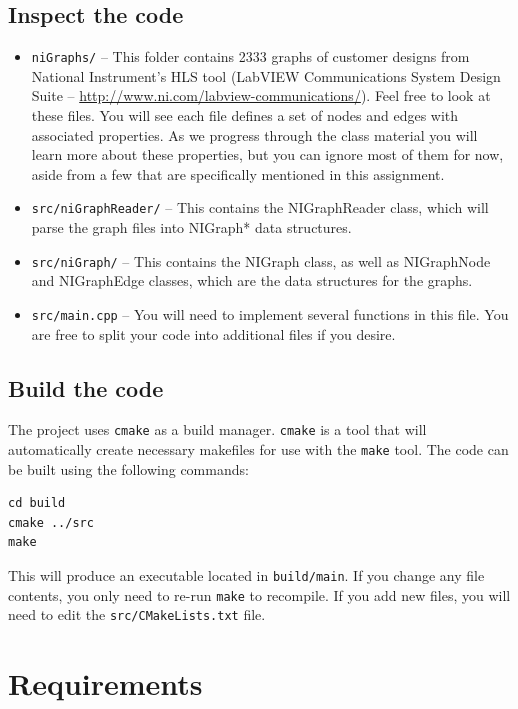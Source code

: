 \subsection{Inspect the code}
\begin{itemize}
	\item {\tt niGraphs/} -- This folder contains 2333 graphs of customer designs from National Instrument's HLS tool (LabVIEW Communications System Design Suite -- \url{http://www.ni.com/labview-communications/}).  Feel free to look at these files.  You will see each file defines a set of nodes and edges with associated properties.  As we progress through the class material you will learn more about these properties, but you can ignore most of them for now, aside from a few that are specifically mentioned in this assignment.
	\item {\tt src/niGraphReader/} -- This contains the NIGraphReader class, which will parse the graph files into NIGraph* data structures.
	\item {\tt src/niGraph/} -- This contains the NIGraph class, as well as NIGraphNode and NIGraphEdge classes, which are the data structures for the graphs.
	\item {\tt src/main.cpp} -- You will need to implement several functions in this file.  You are free to split your code into additional files if you desire.
\end{itemize}

\subsection{Build the code}
The project uses {\tt cmake} as a build manager.  {\tt cmake} is a tool that will automatically create necessary makefiles for use with the {\tt make} tool.
The code can be built using the following commands:
\begin{lstlisting}
cd build
cmake ../src
make
\end{lstlisting}

This will produce an executable located in \texttt{build/main}.  If you change any file contents, you only need to re-run \texttt{make} to recompile.  If you add new files, you will need to edit the \texttt{src/CMakeLists.txt} file.	



\section{Requirements}


